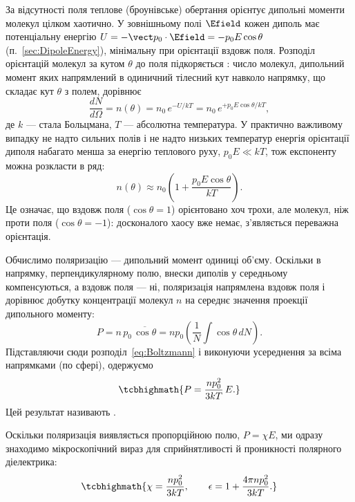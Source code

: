 За відсутності поля теплове (броунівське) обертання орієнтує дипольні моменти молекул цілком хаотично. У зовнішньому полі $\Efield$ кожен диполь
має потенціальну енергію $U = -\vect p_0\cdot\Efield = -p_0 E\cos\theta$ (п.~\ref{sec:DipoleEnergy}), мінімальну при орієнтації вздовж поля.
Розподіл орієнтацій молекул за кутом $\theta$ до поля підкоряється : число молекул, дипольний момент яких напрямлений в
одиничний тілесний кут навколо напрямку, що складає кут $\theta$ з полем, дорівнює
\begin{equation*}
	\frac{dN}{d\Omega} = n(\theta) = n_0\, e^{-U/kT} = n_0\, e^{+p_0 E\cos\theta / kT},
\end{equation*}
де $k$ --- стала Больцмана, $T$ --- абсолютна температура. У практично важливому випадку не надто сильних полів і не надто низьких температур
енергія орієнтації диполя набагато менша за енергію теплового руху, $p_0 E \ll kT$, тож експоненту можна розкласти в ряд:
\begin{equation}\label{eq:Boltzmann}
	n(\theta) \approx n_0\left(1 + \frac{p_0 E \cos\theta}{kT}\right).
\end{equation}
Це означає, що вздовж поля ($\cos\theta = 1$) орієнтовано хоч трохи, але  молекул, ніж проти поля ($\cos\theta = -1$): досконалого
хаосу вже немає, з'являється переважна орієнтація.

Обчислимо поляризацію --- дипольний момент одиниці об'єму. Оскільки в напрямку, перпендикулярному полю, внески диполів у середньому компенсуються, а
вздовж поля --- ні, поляризація напрямлена вздовж поля і дорівнює добутку концентрації молекул $n$ на середнє значення проекції дипольного моменту:
\begin{equation*}
	P = n\, p_0\, \overline{\cos\theta} = n p_0 \left(\frac1N \int \cos\theta\, dN\right).
\end{equation*}
Підставляючи сюди розподіл~\eqref{eq:Boltzmann} і виконуючи усереднення за всіма напрямками (по сфері), одержуємо
\begin{equation}\label{eq:LangevinDebye}
	\tcbhighmath{
		P = \frac{n p_0^2}{3kT}\, E.
	}
\end{equation}
Цей результат називають .

Оскільки поляризація виявляється пропорційною полю, $P = \chi E$, ми одразу знаходимо мікроскопічний вираз для сприйнятливості й проникності
полярного діелектрика:
\begin{equation}\label{eq:CurieLaw}
	\tcbhighmath{
		\chi = \frac{n p_0^2}{3kT}, \qquad \epsilon = 1 + \frac{4\pi n p_0^2}{3kT}.
	}
\end{equation}

